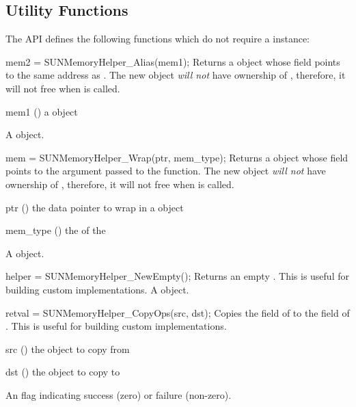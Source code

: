 %
%
\subsection{Utility Functions}

The  API defines the following functions which do not
require a  instance:

{
  mem2 = SUNMemoryHelper\_Alias(mem1);
}
{
  Returns a  object whose  field points to the same address
  as . The new object \textit{will not} have
  ownership of , therefore, it will not free  when
   is called.
}
{
  \begin{args}[mem1]
  \item[mem1] () a  object
  \end{args}
}
{
  A  object.
}
{}

{
  mem = SUNMemoryHelper\_Wrap(ptr, mem\_type);
}
{
  Returns a  object whose  field points to the 
  argument passed to the function. The new object \textit{will not} have
  ownership of , therefore, it will not free  when
   is called.
}
{
  \begin{args}
  \item[ptr] () the data pointer to wrap in a  object
  \item[mem\_type] () the  of the 
  \end{args}
}
{
  A  object.
}
{}

{
  helper = SUNMemoryHelper\_NewEmpty();
}
{
  Returns an empty .
  This is useful for building custom  implementations.
}
{
}
{
  A  object.
}
{}

{
  retval = SUNMemoryHelper\_CopyOps(src, dst);
}
{
  Copies the  field of  to the  field of .
  This is useful for building custom  implementations.
}
{
  \begin{args}[dst]
  \item[src] () the object to copy from
  \item[dst] () the object to copy to
  \end{args}
}
{
  An  flag indicating success (zero) or failure (non-zero).
}
{}


